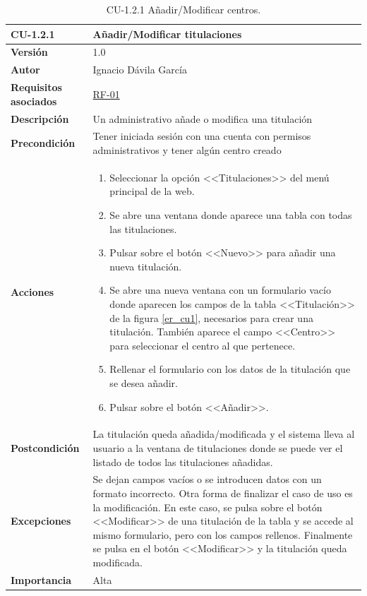 \begin{table}[p]
\label{table:CU-1.2.1}
	\centering
	\begin{tabularx}{\linewidth}{ p{} p{} }
		\toprule
		\textbf{CU-1.2.1}    & \textbf{Añadir/Modificar titulaciones}\\
		\toprule
		\textbf{Versión}              & 1.0    \\
		\textbf{Autor}                & Ignacio Dávila García \\
		\textbf{Requisitos asociados} & \hyperref[itm:RF1]{RF-01} \\
		\textbf{Descripción}          & Un administrativo añade o modifica una titulación \\
		\textbf{Precondición}         & Tener iniciada sesión con una cuenta con permisos administrativos y tener algún centro creado \\
		\textbf{Acciones}             &
		\begin{enumerate}
			\def\labelenumi{\arabic{enumi}.}
			\tightlist
			\item Seleccionar la opción <<Titulaciones>> del menú principal de la web.
			\item Se abre una ventana donde aparece una tabla con todas las titulaciones.
			\item Pulsar sobre el botón <<Nuevo>> para añadir una nueva titulación.
			\item Se abre una nueva ventana con un formulario vacío donde aparecen los campos de la tabla <<Titulación>> de la figura \ref{er_cu1}, necesarios para crear una titulación. También aparece el campo <<Centro>> para seleccionar el centro al que pertenece.
			\item Rellenar el formulario con los datos de la titulación que se desea añadir.
			\item Pulsar sobre el botón <<Añadir>>.
		\end{enumerate}\\
		\textbf{Postcondición}        & La titulación queda añadida/modificada y el sistema lleva al usuario a la ventana de titulaciones donde se puede ver el listado de todos las titulaciones añadidas. \\
		\textbf{Excepciones}          & Se dejan campos vacíos o se introducen datos con un formato incorrecto. Otra forma de finalizar el caso de uso es la modificación. En este caso, se pulsa sobre el botón <<Modificar>> de una titulación de la tabla y se accede al mismo formulario, pero con los campos rellenos. Finalmente se pulsa en el botón <<Modificar>> y la titulación queda modificada. \\
		\textbf{Importancia}          & Alta \\
		\bottomrule
	\end{tabularx}
	\caption{CU-1.2.1 Añadir/Modificar centros.}
\end{table}
\FloatBarrier

